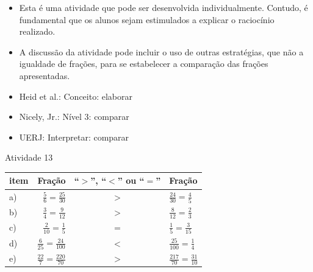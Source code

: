 \begin{multicols}{2}
  
 
\begin{itemize} %
    \item       Esta é uma atividade que pode ser desenvolvida individualmente. 
Contudo, é fundamental que os alunos sejam estimulados a explicar o raciocínio 
realizado.
    \item       A discussão da atividade pode incluir o uso de outras 
estratégias, que não a igualdade de frações, para se estabelecer a comparação 
das frações apresentadas. 
\end{itemize} %
  
  
   \vspace{.1cm}
  
 \vspace{.1cm}
   
\begin{itemize} %
    \item       Heid et al.: Conceito: elaborar
    \item       Nicely, Jr.: Nível 3: comparar
    \item       UERJ: Interpretar: comparar
\end{itemize} %

\begin{resposta*}{Atividade 13}
  
\noindent
    \begin{tabular}{lrcl}
      
       item &  Fração &  ``$>$'', ``$<$'' ou ``$=$'' &  Fração \\
      \hline 
       a) &  $\frac{5}{6} = \frac{25}{30}$ &   $>$  &  $\frac{24}{30} = 
\frac{4}{5}$ \\
     
       b) &  $\frac{3}{4} = \frac{9}{12}$ &   $>$  &  $\frac{8}{12} = 
\frac{2}{3}$ \\
     
       c) &  $\frac{2}{10} = \frac{1}{5}$ &   $=$  &  $\frac{1}{5} = 
\frac{3}{15}$ \\
     
       d) &  $\frac{6}{25} = \frac{24}{100}$ &   $<$  &  $\frac{25}{100} = 
\frac{1}{4}$ \\
     
       e) &  $\frac{22}{7} = \frac{220}{70}$ &   $>$  &  $\frac{217}{70} = 
\frac{31}{10}$ \\
     

\end{tabular}
\end{resposta*}
\end{multicols}
